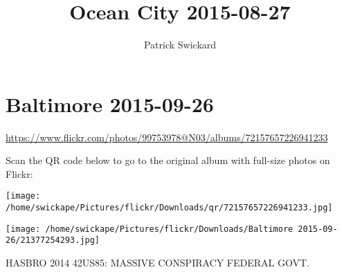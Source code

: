 \documentclass[10pt,letterpaper]{article}
\title{Ocean City 2015-08-27}
\author{Patrick Swickard}
\date{}
\begin{document}
\section*{Baltimore 2015-09-26}

\url{https://www.flickr.com/photos/99753978@N03/albums/72157657226941233}

Scan the QR code below to go to the original album with full-size photos on Flickr:

\texttt{[image: /home/swickape/Pictures/flickr/Downloads/qr/72157657226941233.jpg]}
\pagebreak

\texttt{[image: /home/swickape/Pictures/flickr/Downloads/Baltimore 2015-09-26/21377254293.jpg]}

HASBRO 2014 42US85: MASSIVE CONSPIRACY FEDERAL GOVT.
\pagebreak
\end{document}
